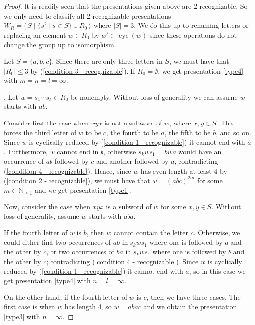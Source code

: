 \documentclass[10pt,a4paper]{amsart}
\newcommand{\N}{\mathbb{N}}
\newcommand{\cyc}{\operatorname{cyc}}
\newcommand{\mpair}[1]{\langle\, #1\,\rangle}  %
\begin{document}
\begin{proof}  It is readily seen that the presentations given above are $2$-recognizable. So we only need to classify all 2-recognizable presentations $W_R = \mpair{S \mid \{s^2 \mid s \in S\} \cup R_0}$ where $|S|=3$. We do this up to renaming letters or replacing an element $w \in R_0$ by $w' \in \cyc(w)$ since these operations do not change the group up to isomorphism.
    
    
    \smallskip
    Let $S = \{a,b,c\}$. Since there are only three letters in $S$, we must have that $|R_0| \leq 3$ by (\ref{condition 3 - recognizable}). If $R_0=\emptyset$, we get presentation \ref{type4} with $m=n=l=\infty$.

    \smallskip
    .  Let $w = s_1 \cdots s_k \in R_0$ be nonempty. Without loss of generality we can assume $w$ starts with $ab$.
    
    Consider first the case when $xyx$ is not a subword of $w$, where $x,y \in S$. This forces the third letter of $w$ to be $c$, the fourth to be $a$, the fifth to be $b$, and so on. Since $w$ is cyclically reduced by (\ref{condition 1 - recognizable}) it cannot end with $a$. Furthermore, $w$ cannot end in $b$, otherwise $s_kws_1 = bwa$ would have an occurrence of $ab$ followed by $c$ and another followed by $a$, contradicting (\ref{condition 4 - recognizable}). Hence, since $w$ has even length at least 4 by (\ref{condition 2 - recognizable}), we must have that $w=(abc)^{2m}$ for some $m \in \N_{\geq 1}$ and we get presentation \ref{type1}. 
    
    Now, consider the case when $xyx$ is a subword of $w$ for some $x,y \in S$. Without loss of generality, assume $w$ starts with $aba$. 
    
    If the fourth letter of $w$ is $b$, then $w$ cannot contain the letter $c$. Otherwise, we could either find two occurrences of $ab$ in $s_kws_1$ where one is followed by $a$ and the other by $c$, or two occurrences of $ba$ in $s_kws_1$ where one is followed by $b$ and the other by $c$; contradicting (\ref{condition 4 - recognizable}). Since $w$ is cyclically reduced by (\ref{condition 1 - recognizable}) it cannot end with $a$, so in this case we get presentation \ref{type4} with $n=l=\infty$. 
    
    On the other hand, if the fourth letter of $w$ is $c$, then we have three cases. The first case is when $w$ has length 4, so $w=abac$ and we obtain the presentation \ref{type3} with $n=\infty$. 
    

\end{proof}
\end{document}
